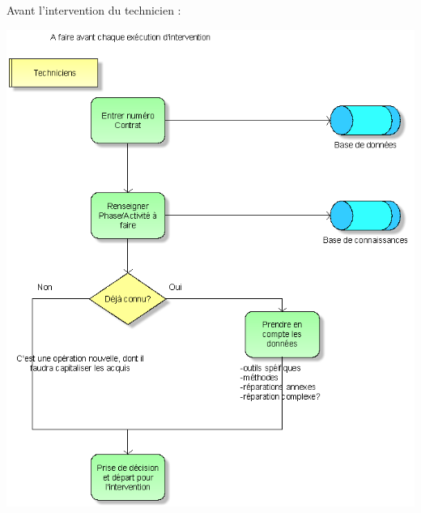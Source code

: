 \begin{itemize}
Avant l'intervention du technicien :
\begin {center}
\includegraphics[width=\textwidth]{png_cible_fonctionnelle/AideTechnicienAvantInterventionTechnique.png}
\end {center}


\end{itemize}
